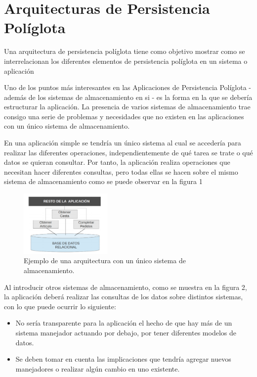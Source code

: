 \documentclass[conference]{IEEEtran}
\begin{document}
\section{Arquitecturas de Persistencia Pol\'iglota}
Una arquitectura de persistencia políglota tiene como objetivo mostrar como se interrelacionan los diferentes elementos de persistencia políglota en un sistema o aplicación

Uno de los puntos más interesantes en las Aplicaciones de Persistencia Políglota - adem\'as
de los sistemas de almacenamiento en si - es la forma en la que se debería estructurar
la aplicaci\'on. La presencia de varios sistemas de almacenamiento trae consigo una serie
de problemas y necesidades que no existen en las aplicaciones con un \'unico sistema de
almacenamiento.

En una aplicaci\'on simple se tendr\'ia un \'unico sistema al cual se acceder\'ia para realizar las diferentes operaciones, independientemente de qu\'e tarea se trate o qu\'e datos se quieran consultar. Por tanto, la aplicaci\'on realiza operaciones que necesitan hacer diferentes consultas, pero todas ellas se hacen sobre el mismo sistema de almacenamiento como se puede observar en la figura 1

\begin{figure}[!h]
\centering
\includegraphics[width=0.4\textwidth]{1}
\caption{Ejemplo de una arquitectura con un \'unico sistema de almacenamiento.}
\label{fig1}
\end{figure}
Al introducir otros sistemas de almacenamiento, como se muestra en la figura 2, la aplicaci\'on deber\'a realizar las consultas de los datos sobre distintos sistemas, con lo que puede ocurrir lo siguiente:

\begin{itemize}
\item  No ser\'ia transparente para la aplicaci\'on el hecho de que hay m\'as de un sistema manejador actuando por debajo, por tener diferentes modelos de datos.
\item  Se deben tomar en cuenta las implicaciones que tendría agregar nuevos manejadores o realizar algún cambio en uno existente.
\end{itemize}
\end{document}
